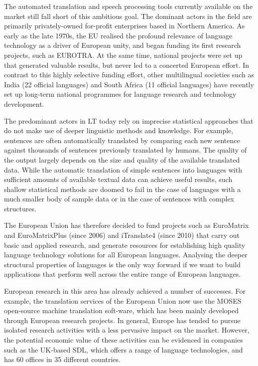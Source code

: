 \documentclass[]{../../metanetpaper}
\begin{document}
\begin{multicols}{2}

The automated translation and speech processing tools currently available on the market still fall short of this ambitious goal. The dominant actors in the field are primarily privately-owned for-profit enterprises based in Northern America. As early as the late 1970s, the EU realised the profound relevance of language technology as a driver of European unity, and began funding its first research projects, such as EUROTRA. At the same time, national projects were set up that generated valuable results, but never led to a concerted European effort. In contrast to this highly selective funding effort, other multilingual societies such as India (22 official languages) and South Africa (11 official languages) have recently set up long-term national programmes for language research and technology development. 

The predominant actors in LT today rely on imprecise statistical approaches that do not make use of deeper linguistic methods and knowledge. For example, sentences are often automatically translated by comparing each new sentence against thousands of sentences previously translated by humans. The quality of the output largely depends on the size and quality of the available translated data. While the automatic translation of simple sentences into languages with sufficient amounts of available textual data can achieve useful results, such shallow statistical methods are doomed to fail in the case of languages with a much smaller body of sample data or in the case of sentences with complex structures.

The European Union has therefore decided to fund projects such as EuroMatrix and EuroMatrixPlus (since 2006) and iTranslate4 (since 2010) that carry out basic and applied research, and generate resources for establishing high quality language technology solutions for all European languages. Analysing the deeper structural properties of languages is the only way forward if we want to build applications that perform well across the entire range of European languages.

European research in this area has already achieved a number of successes. For example, the translation services of the European Union now use the MOSES open-source machine translation soft-ware, which has been mainly developed through European research projects. In general, Europe has tended to pursue isolated research activities with a less pervasive impact on the market. However, the potential economic value of these activities can be evidenced in companies such as the UK-based SDL, which offers a range of language technologies, and has 60 offices in 35 different countries. 


\end{multicols}
\end{document}
